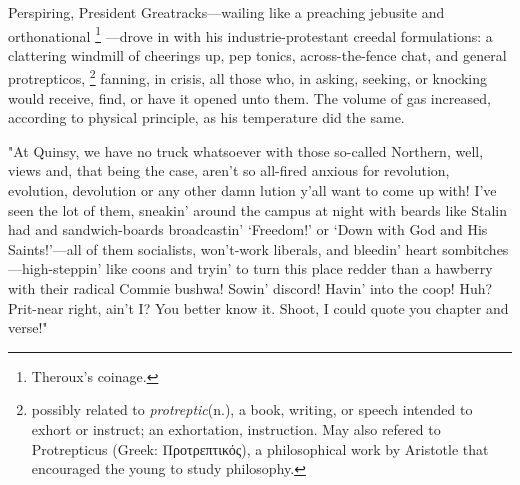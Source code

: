   Perspiring, 
President Greatracks---wailing 
like a preaching jebusite 
and orthonational
\footnote{ \textdbend Theroux's coinage.}
---drove in with his industrie-protestant creedal 
formulations: a clattering 
windmill of cheerings up, pep 
tonics, 
across-the-fence chat, and general protrepticos, 
\footnote{ \textdbend possibly related to \textit{protreptic}(n.), a book,
writing, or speech intended to exhort or instruct; an exhortation, instruction.
May also refered to Protrepticus (Greek: Προτρεπτικός), a philosophical work
by Aristotle that encouraged the young to study philosophy.
}
fanning, in crisis, all those who, in asking, seeking, or
knocking would receive, find, or have it opened unto them. The volume of gas
increased, according to physical principle, as his temperature did the same.
 
  "At Quinsy, we have no truck whatsoever with those so-called Northern, well,
views and, that being the case, aren't so all-fired anxious for revolution,
evolution, devolution or any other damn lution y'all want to come up with! I've
seen the lot of them, sneakin' around the campus at night with beards like
Stalin had and sandwich-boards broadcastin' `Freedom!' or `Down with God and His
Saints!'---all of them socialists, won't-work liberals, and bleedin' heart
sombitches---high-steppin' like coons 
and tryin' to turn this place redder than a hawberry 
with their radical Commie bushwa! 
Sowin' discord! Havin' into the coop!
Huh? Prit-near right, ain't I? You better know it. Shoot, I could quote you
chapter and verse!"
 

